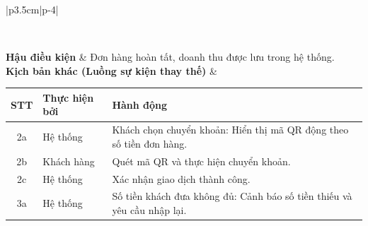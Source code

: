 \documentclass[../20232006p.tex]{subfiles}
\begin{document}
\begin{center}
\begin{longtable}{|p{3.5cm}|p{\dimexpr\textwidth-3.5cm-4\tabcolsep\relax}|}
\begin{tabular}{|c|p{2cm}|p{6.5cm}|}
            \hline
        \end{tabular}
        \vspace{0.5em}                                                                                                    \\
        \hline
        \textbf{Hậu điều kiện}                          & Đơn hàng hoàn tất, doanh thu được lưu trong hệ thống.           \\
        \hline
        \textbf{Kịch bản khác (Luồng sự kiện thay thế)} &
        \vspace{0.5em}
        \begin{tabular}{|c|p{2cm}|p{6.5cm}|}
            \hline
            \textbf{STT} & \textbf{Thực hiện bởi} & \textbf{Hành động}                                                      \\
            \hline
            2a           & Hệ thống               & Khách chọn chuyển khoản: Hiển thị mã QR động theo số tiền đơn hàng.     \\
            \hline
            2b           & Khách hàng             & Quét mã QR và thực hiện chuyển khoản.                                   \\
            \hline
            2c           & Hệ thống               & Xác nhận giao dịch thành công.                                          \\
            \hline
            3a           & Hệ thống               & Số tiền khách đưa không đủ: Cảnh báo số tiền thiếu và yêu cầu nhập lại. \\
            \hline
        \end{tabular}
        \vspace{0.5em}                                                                                                    \\
        \hline
        \caption{Đặc tả chức năng Thanh toán}
        \label{tab:uc_payment}
    \end{longtable}
\end{center}
\hfill
\end{document}
